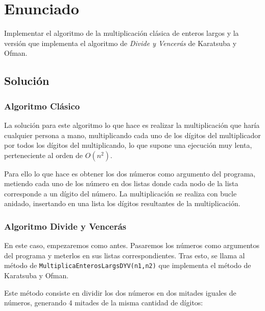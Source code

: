 \documentclass[10pt,a4paper,spanish]{report}
\begin{document}
\section{\textcolor[rgb]{0.1,0.2,1}Enunciado}

Implementar el algoritmo de la multiplicación clásica de enteros largos y la versión que implementa el algoritmo de \textit{\textcolor[rgb]{0.1,0.2,1}{Divide y Vencerás}} de Karatsuba y Ofman.

\subsection{\textcolor[rgb]{0.1,0.2,1}Solución}

\subsubsection{\textcolor[rgb]{0.1,0.2,1}Algoritmo Clásico}

La solución para este algoritmo lo que hace es realizar la multiplicación que haría cualquier persona a mano, multiplicando cada uno de los dígitos del multiplicador por todos los dígitos del multiplicando, lo que supone una ejecución muy lenta, perteneciente al orden de $O(n^2)$.

\begin{center}
  
\end{center}

Para ello lo que hace es obtener los dos números como argumento del programa, metiendo cada uno de los número en dos listas donde cada nodo de la lista corresponde a un dígito del número. La multiplicación se realiza con bucle anidado, insertando en una lista los dígitos resultantes de la multiplicación.


\subsubsection{\textcolor[rgb]{0.1,0.2,1}Algoritmo Divide y Vencerás}

En este caso, empezaremos como antes. Pasaremos los números como argumentos del programa y meterlos en sus listas correspondientes. Tras esto, se llama al método de \verb*|MultiplicaEnterosLargsDYV(n1,n2)| que implementa el método de Karatsuba y Ofman.

Este método consiste en dividir los dos números en dos mitades iguales de números, generando 4 mitades de la misma cantidad de dígitos:
\end{document}

